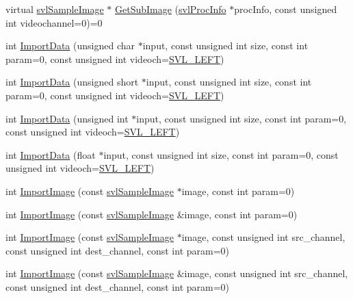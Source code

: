 \begin{DoxyCompactItemize}
\item 
virtual \hyperlink{classsvl_sample_image}{svl\+Sample\+Image} $\ast$ \hyperlink{classsvl_sample_image_a034171461bca11c13606f03abbf526a3}{Get\+Sub\+Image} (\hyperlink{structsvl_proc_info}{svl\+Proc\+Info} $\ast$proc\+Info, const unsigned int videochannel=0)=0
\item 
int \hyperlink{classsvl_sample_image_aef0e73b0e5906d4b60e689f41ff49a48}{Import\+Data} (unsigned char $\ast$input, const unsigned int size, const int param=0, const unsigned int videoch=\hyperlink{svl_definitions_8h_ab9fec7615f19c8df2919eebcab0b187f}{S\+V\+L\+\_\+\+L\+E\+F\+T})
\item 
int \hyperlink{classsvl_sample_image_a11b13d1f63e3a8581a84c848a83e8f85}{Import\+Data} (unsigned short $\ast$input, const unsigned int size, const int param=0, const unsigned int videoch=\hyperlink{svl_definitions_8h_ab9fec7615f19c8df2919eebcab0b187f}{S\+V\+L\+\_\+\+L\+E\+F\+T})
\item 
int \hyperlink{classsvl_sample_image_a92d332b2a5d130f19a4fc4aae9fc181c}{Import\+Data} (unsigned int $\ast$input, const unsigned int size, const int param=0, const unsigned int videoch=\hyperlink{svl_definitions_8h_ab9fec7615f19c8df2919eebcab0b187f}{S\+V\+L\+\_\+\+L\+E\+F\+T})
\item 
int \hyperlink{classsvl_sample_image_a6a64f4d94e9af374c72f94fa6b722ebd}{Import\+Data} (float $\ast$input, const unsigned int size, const int param=0, const unsigned int videoch=\hyperlink{svl_definitions_8h_ab9fec7615f19c8df2919eebcab0b187f}{S\+V\+L\+\_\+\+L\+E\+F\+T})
\item 
int \hyperlink{classsvl_sample_image_a762e6af7ff5258f2be32303ef0127b80}{Import\+Image} (const \hyperlink{classsvl_sample_image}{svl\+Sample\+Image} $\ast$image, const int param=0)
\item 
int \hyperlink{classsvl_sample_image_a714d30ac5f7c020e27a9e227748e1422}{Import\+Image} (const \hyperlink{classsvl_sample_image}{svl\+Sample\+Image} \&image, const int param=0)
\item 
int \hyperlink{classsvl_sample_image_a15dddfe94cc94595368e31e827bda277}{Import\+Image} (const \hyperlink{classsvl_sample_image}{svl\+Sample\+Image} $\ast$image, const unsigned int src\+\_\+channel, const unsigned int dest\+\_\+channel, const int param=0)
\item 
int \hyperlink{classsvl_sample_image_a06d3e066bf3e6e6f1e0dcb650c4e48e1}{Import\+Image} (const \hyperlink{classsvl_sample_image}{svl\+Sample\+Image} \&image, const unsigned int src\+\_\+channel, const unsigned int dest\+\_\+channel, const int param=0)

\end{DoxyCompactItemize}
